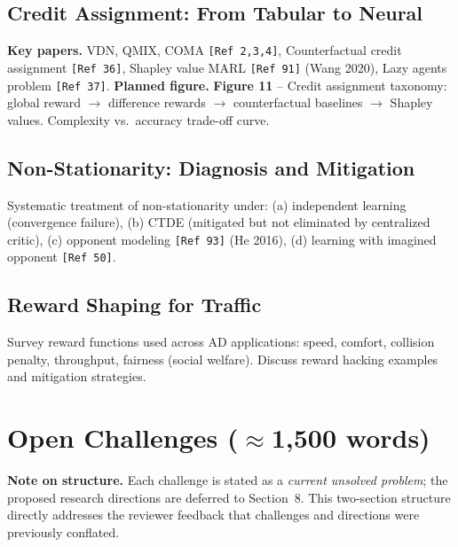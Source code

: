 \documentclass[12pt, a4paper]{article}
\begin{document}
\subsection{Credit Assignment: From Tabular to Neural}

\begin{outline_note}
\textbf{Key papers.}
VDN, QMIX, COMA \texttt{[Ref\,2,3,4]},
Counterfactual credit assignment \texttt{[Ref\,36]},
Shapley value MARL \texttt{[Ref\,91]} (Wang 2020),
Lazy agents problem \texttt{[Ref\,37]}.
\textbf{Planned figure.}
\textbf{Figure 11} -- Credit assignment taxonomy: global reward
$\to$ difference rewards $\to$ counterfactual baselines
$\to$ Shapley values.  Complexity vs.\ accuracy trade-off curve.
\end{outline_note}

\subsection{Non-Stationarity: Diagnosis and Mitigation}

\begin{outline_note}
Systematic treatment of non-stationarity under:
(a) independent learning (convergence failure),
(b) CTDE (mitigated but not eliminated by centralized critic),
(c) opponent modeling \texttt{[Ref\,93]} (He 2016),
(d) learning with imagined opponent \texttt{[Ref\,50]}.
\end{outline_note}

\subsection{Reward Shaping for Traffic}

\begin{outline_note}
Survey reward functions used across AD applications:
speed, comfort, collision penalty, throughput, fairness (social welfare).
Discuss reward hacking examples and mitigation strategies.
\end{outline_note}

\section{Open Challenges \textnormal{\small ($\approx$1{,}500 words)}}
\label{sec:challenges}

\begin{outline_note}
\textbf{Note on structure.}
Each challenge is stated as a \emph{current unsolved problem};
the proposed research directions are deferred to Section~8.
This two-section structure directly addresses the reviewer feedback that
challenges and directions were previously conflated.
\end{outline_note}
\end{document}
